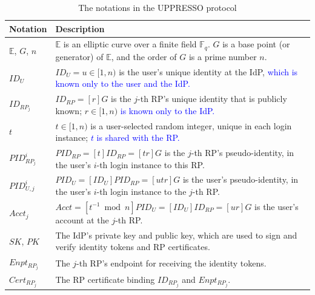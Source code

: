 \begin{table}[tb]
\footnotesize
    \caption{The notations in the UPPRESSO protocol}
    \centering
    \begin{tabular}{|p{1.0cm}|p{6.60cm}|} \hline
    {\textbf{Notation}} & {\textbf{Description}} \\ \hline
    {$\mathbb{E}$, $G$, $n$} & {$\mathbb{E}$ is an elliptic curve over a finite field $\mathbb{F}_q$. $G$ is a base point (or generator) of $\mathbb{E}$, and the order of $G$ is a prime number $n$.} \\ \hline
    {$ID_U$} & {$ID_U = u \in [1, n)$ is the user's unique identity at the IdP, \textcolor{blue}{which is known only to the user and the IdP. %
    }} \\ \hline
   {$ID_{RP_j}$} & {$ID_{RP} = [r]G$ is the $j$-th RP's unique identity that is publicly known; $r \in [1, n)$ \textcolor{blue}{is known only to the IdP.}} \\ \hline
    {$t$} & {$t \in [1, n)$ is a user-selected random integer, unique in each login instance; \textcolor{blue}{$t$ is shared with the RP. %
    }} \\ \hline
    {$PID_{RP_j}^i$} & {$PID_{RP} = [t]{ID_{RP}} = [tr]G$ is the $j$-th RP's pseudo-identity, in the user's $i$-th login instance to this RP.} \\ \hline
    {$PID_{U,j}^i$} & {$PID_U = [{ID_U}]{PID_{RP}} = [utr]G$ is the user's pseudo-identity, in the user's $i$-th login instance to the $j$-th RP.} \\ \hline
     {$Acct_j$} & {$Acct = [t^{-1}\bmod n]PID_{U} = [ID_U]ID_{RP} = [ur]G$ is the user's account at the $j$-th RP.} \\ \hline
    {$SK$, $PK$} & {The IdP's private key and public key, which are used to sign and verify identity tokens and RP certificates.} \\ \hline
    {$Enpt_{RP_j}$} & {The $j$-th RP's endpoint for receiving the identity tokens.} \\ \hline
    {$Cert_{RP_j}$} & {The RP certificate binding $ID_{RP_j}$ and $Enpt_{RP_j}$.} \\ \hline
    \end{tabular}
    \label{tbl:notations-protocol}
\end{table}



